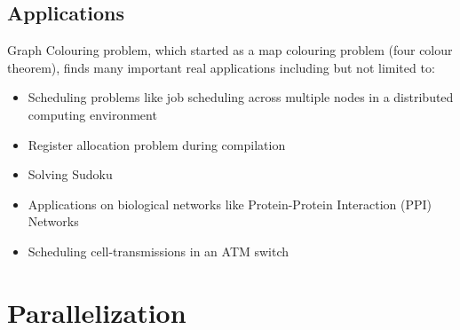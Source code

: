 \documentclass[MTech]{iitmdiss}
\begin{document}
\subsection{Applications}
Graph Colouring problem, which started as a map colouring problem (four colour theorem), finds many important real applications including but not limited to:
\begin{itemize}
\item Scheduling problems like job scheduling across multiple nodes in a distributed computing environment \citep{leighton1979graph}
\item Register allocation problem during compilation \citep{Briggs:2004:CHR:989393.989424}
\item Solving Sudoku \citep{herzberg2007sudoku}
\item Applications on biological networks like Protein-Protein Interaction (PPI) Networks \citep{khor2009application}
\item Scheduling cell-transmissions in an ATM switch \citep{lakshman1994graph}
\end{itemize}
\section{Parallelization}
\end{document}
